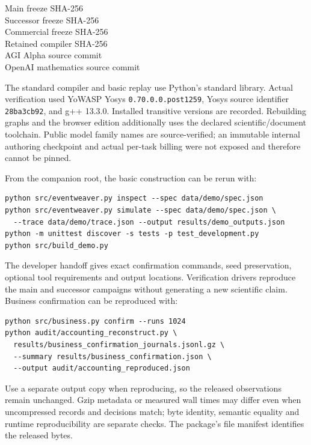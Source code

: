 \begin{description}
\item[Main freeze SHA-256] 
\item[Successor freeze SHA-256] 
\item[Commercial freeze SHA-256] 
\item[Retained compiler SHA-256] 
\item[AGI Alpha source commit] 
\item[OpenAI mathematics source commit] 
\end{description}

The standard compiler and basic replay use Python's standard library. Actual verification used YoWASP Yosys \texttt{0.70.0.0.post1259}, Yosys source identifier \texttt{28ba3cb92}, and g++ 13.3.0. Installed transitive versions are recorded. Rebuilding graphs and the browser edition additionally uses the declared scientific/document toolchain. Public model family names are source-verified; an immutable internal authoring checkpoint and actual per-task billing were not exposed and therefore cannot be pinned.

From the companion root, the basic construction can be rerun with:
\begin{verbatim}
python src/eventweaver.py inspect --spec data/demo/spec.json
python src/eventweaver.py simulate --spec data/demo/spec.json \
  --trace data/demo/trace.json --output results/demo_outputs.json
python -m unittest discover -s tests -p test_development.py
python src/build_demo.py
\end{verbatim}
The developer handoff gives exact confirmation commands, seed preservation, optional tool requirements and output locations. Verification drivers reproduce the main and successor campaigns without generating a new scientific claim. Business confirmation can be reproduced with:
\begin{verbatim}
python src/business.py confirm --runs 1024
python audit/accounting_reconstruct.py \
  results/business_confirmation_journals.jsonl.gz \
  --summary results/business_confirmation.json \
  --output audit/accounting_reproduced.json
\end{verbatim}
Use a separate output copy when reproducing, so the released observations remain unchanged. Gzip metadata or measured wall times may differ even when uncompressed records and decisions match; byte identity, semantic equality and runtime reproducibility are separate checks. The package's file manifest identifies the released bytes.

